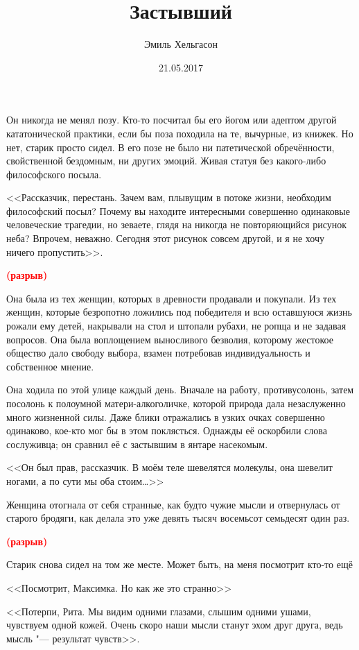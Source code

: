 \documentclass[a4paper,10pt,fleqn]{book}
\newcommand{\ldotst}{\so{...}\xspace}
\newcommand{\ldotsq}{\so{?\hbox{\hspace{-.212em}}..}\xspace}
\newcommand{\spacing}{\textcolor{red}{\textbf{(разрыв)}}}
\begin{document}
\author{Эмиль Хельгасон}
\title{Застывший}
\date{21.05.2017}
\maketitle

Он никогда не менял позу.
Кто-то посчитал бы его йогом или адептом другой кататонической практики, если бы поза походила на те, вычурные, из книжек.
Но нет, старик просто сидел.
В его позе не было ни патетической обречённости, свойственной бездомным, ни других эмоций.
Живая статуя без какого-либо философского посыла.

<<Рассказчик, перестань.
Зачем вам, плывущим в потоке жизни, необходим философский посыл?
Почему вы находите интересными совершенно одинаковые человеческие трагедии, но зеваете, глядя на никогда не повторяющийся рисунок неба?
Впрочем, неважно.
Сегодня этот рисунок совсем другой, и я не хочу ничего пропустить>>.

\spacing

Она была из тех женщин, которых в древности продавали и покупали.
Из тех женщин, которые безропотно ложились под победителя и всю оставшуюся жизнь рожали ему детей, накрывали на стол и штопали рубахи, не ропща и не задавая вопросов.
Она была воплощением выносливого безволия, которому жестокое общество дало свободу выбора, взамен потребовав индивидуальность и собственное мнение. 

Она ходила по этой улице каждый день.
Вначале на работу, противусолонь, затем посолонь к полоумной матери-алкоголичке, которой природа дала незаслуженно много жизненной силы.
Даже блики отражались в узких очках совершенно одинаково, кое-кто мог бы в этом поклясться.
Однажды её оскорбили слова сослуживца;
он сравнил её с застывшим в янтаре насекомым.

<<Он был прав, рассказчик.
В моём теле шевелятся молекулы, она шевелит ногами, а по сути мы оба стоим\dots>>

\ldotst Женщина отогнала от себя странные, как будто чужие мысли и отвернулась от старого бродяги, как делала это уже девять тысяч восемьсот семьдесят один раз.

\spacing

Старик снова сидел на том же месте.
Может быть, на меня посмотрит кто-то ещё\ldotsq

<<Посмотрит, Максимка.
Но как же это странно\ldotst >>

<<Потерпи, Рита.
Мы видим одними глазами, слышим одними ушами, чувствуем одной кожей.
Очень скоро наши мысли станут эхом друг друга, ведь мысль "--- результат чувств>>.
\end{document}
